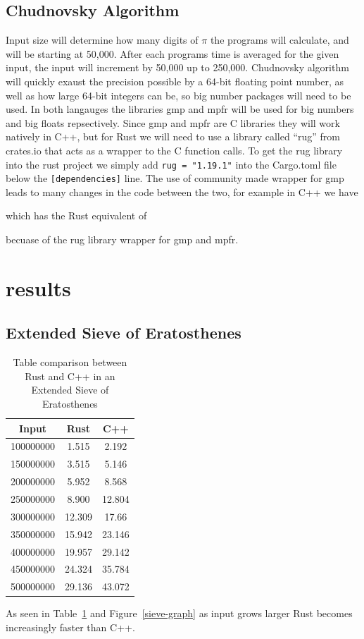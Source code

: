\documentclass[10pt]{IEEEtran}
\begin{document}
\subsection{Chudnovsky Algorithm}
Input size will determine how many digits of $\pi$ the programs will calculate, and will be starting at 50,000. 
After each programs time is averaged for the given input, the input will increment by 50,000 up to 250,000.
Chudnovsky algorithm will quickly exaust the precision possible by a 64-bit floating point number, as well as how large 64-bit integers can be, so big number packages will need to be used.
In both langauges the libraries gmp\cite{gmp} and mpfr\cite{mpfr} will be used for big numbers and big floats repsectively.
Since gmp and mpfr are C libraries they will work natively in C++, but for Rust we will need to use a library called ``rug'' from crates.io that acts as a wrapper to the C function calls\cite{rug}.
To get the rug library into the rust project we simply add \verb|rug = "1.19.1"| into the Cargo.toml file below the \verb|[dependencies]| line.
The use of community made wrapper for gmp leads to many changes in the code between the two, for example in C++ we have

which has the Rust equivalent of

becuase of the rug library wrapper for gmp and mpfr.
\section{results}
\subsection{Extended Sieve of Eratosthenes}
\begin{table}[!ht]
    \centering
    \begin{tabular}{|c|cc|}
        \hline
        \rowcolor{lightgray}
            Input & Rust & C++ \\ \hline
            100000000 & 1.515 & 2.192 \\ 
            150000000 & 3.515 & 5.146 \\ 
            200000000 & 5.952 & 8.568 \\ 
            250000000 & 8.900 & 12.804 \\ 
            300000000 & 12.309 & 17.66 \\ 
            350000000 & 15.942 & 23.146 \\ 
            400000000 & 19.957 & 29.142 \\ 
            450000000 & 24.324 & 35.784 \\ 
            500000000 & 29.136 & 43.072\\ \hline
        \end{tabular}
    \caption{\label{sieve-table}Table comparison between Rust and C++ in an Extended Sieve of Eratosthenes}
\end{table}
As seen in Table~\ref{sieve-table} and Figure~\ref{sieve-graph} as input grows larger Rust becomes increasingly faster than C++.
\end{document}
